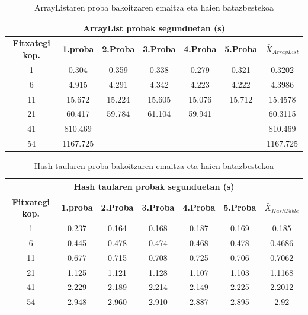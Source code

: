 \documentclass[a4paper,10pt]{report}
\begin{document}
\begin{table}[h!]
	\begin{scriptsize}
		\begin{center}
			\begin{tabular}[h!]{|c|c|c|c|c|c|c|}
				\hline
				\multicolumn{7}{|c|}{ArrayList probak segunduetan (s)}\tabularnewline
				\hline 
				\textbf{Fitxategi kop.} & \textbf{1.proba} & \textbf{2.Proba} & \textbf{3.Proba} & \textbf{4.Proba} & \textbf{5.Proba} & $\bar{X}_{ArrayList}$ \\
				\hline
				1 & 0.304 & 0.359 & 0.338 & 0.279 & 0.321 & 0.3202  \\
				\hline
				6 & 4.915 & 4.291 & 4.342 & 4.223 & 4.222 & 4.3986 \\
				\hline
				11 & 15.672 & 15.224 & 15.605 & 15.076 & 15.712 & 15.4578 \\
				\hline
				21 & 60.417 & 59.784 & 61.104 & 59.941 & & 60.3115 \\
				\hline
				41 & 810.469 &  &  &  &  & 810.469 \\
				\hline
				54 & 1167.725 &  &  &  &  & 1167.725 \\
				\hline
	\end{tabular}\end{center}\end{scriptsize}
	\caption{\label{tab3} ArrayListaren proba bakoitzaren emaitza eta haien batazbestekoa
	}
\end{table}

\begin{table}[h!]
	\begin{scriptsize}
		\begin{center}
			\begin{tabular}[h!]{|c|c|c|c|c|c|c|}
				\hline
				\multicolumn{7}{|c|}{Hash taularen probak segunduetan (s)}\tabularnewline
				\hline 
				\textbf{Fitxategi kop.} & \textbf{1.proba} & \textbf{2.Proba} & \textbf{3.Proba} & \textbf{4.Proba} & \textbf{5.Proba} & $\bar{X}_{HashTable}$ \\
				\hline
				1 & 0.237 & 0.164 & 0.168 & 0.187 & 0.169 & 0.185  \\
				\hline
				6 & 0.445 & 0.478 & 0.474 & 0.468 & 0.478 & 0.4686 \\
				\hline
				11 & 0.677 & 0.715 & 0.708 & 0.725 & 0.706 & 0.7062 \\
				\hline
				21 & 1.125 & 1.121 & 1.128 & 1.107 & 1.103 & 1.1168 \\
				\hline
				41 & 2.229 & 2.189 & 2.214 & 2.149 & 2.225 & 2.2012 \\
				\hline
				54 & 2.948 & 2.960 & 2.910 & 2.887 & 2.895 & 2.92 \\
				\hline
	\end{tabular}\end{center}\end{scriptsize}
	\caption{\label{tab3} Hash taularen proba bakoitzaren emaitza eta haien batazbestekoa
	}
\end{table}
\end{document}
